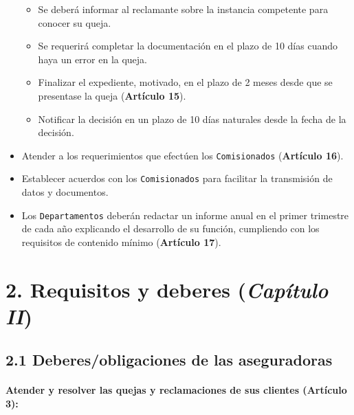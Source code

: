 \documentclass[
]{article}
\providecommand{\tightlist}{%
  \setlength{\itemsep}{0pt}\setlength{\parskip}{0pt}}
\begin{document}
\begin{itemize}
  \begin{itemize}
  \tightlist
  \item
    Se deberá informar al reclamante sobre la instancia competente para
    conocer su queja.
  \item
    Se requerirá completar la documentación en el plazo de 10 días
    cuando haya un error en la queja.
  \item
    Finalizar el expediente, motivado, en el plazo de 2 meses desde que
    se presentase la queja (\textbf{Artículo 15}).
  \item
    Notificar la decisión en un plazo de 10 días naturales desde la
    fecha de la decisión.
  \end{itemize}
\item
  Atender a los requerimientos que efectúen los \texttt{Comisionados}
  (\textbf{Artículo 16}).
\item
  Establecer acuerdos con los \texttt{Comisionados} para facilitar la
  transmisión de datos y documentos.
\item
  Los \texttt{Departamentos} deberán redactar un informe anual en el
  primer trimestre de cada año explicando el desarrollo de su función,
  cumpliendo con los requisitos de contenido mínimo (\textbf{Artículo
  17}).
\end{itemize}

\hypertarget{requisitos-y-deberes-capuxedtulo-ii}{%
\section{\texorpdfstring{2. Requisitos y deberes (\emph{Capítulo
II})}{2. Requisitos y deberes (Capítulo II)}}\label{requisitos-y-deberes-capuxedtulo-ii}}

\hypertarget{deberesobligaciones-de-las-aseguradoras}{%
\subsection{2.1 Deberes/obligaciones de las
aseguradoras}\label{deberesobligaciones-de-las-aseguradoras}}

\hypertarget{atender-y-resolver-las-quejas-y-reclamaciones-de-sus-clientes-artuxedculo-3}{%
\paragraph{\texorpdfstring{Atender y resolver las quejas y reclamaciones
de sus clientes (\textbf{Artículo
3}):}{Atender y resolver las quejas y reclamaciones de sus clientes (Artículo 3):}}\label{atender-y-resolver-las-quejas-y-reclamaciones-de-sus-clientes-artuxedculo-3}}
\end{document}
